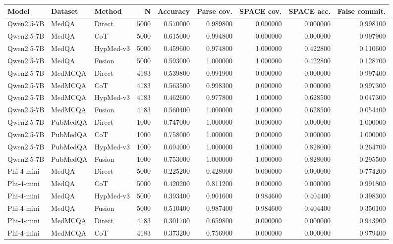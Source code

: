 \begin{tabular}{lllrrrrrr}
\toprule
Model & Dataset & Method & N & Accuracy & Parse cov. & SPACE cov. & SPACE acc. & False commit. \\
\midrule
Qwen2.5-7B & MedQA & Direct & 5000 & 0.570000 & 0.989800 & 0.000000 & 0.000000 & 0.998100 \\
Qwen2.5-7B & MedQA & CoT & 5000 & 0.615000 & 0.994800 & 0.000000 & 0.000000 & 0.997900 \\
Qwen2.5-7B & MedQA & HypMed-v3 & 5000 & 0.459600 & 0.974800 & 1.000000 & 0.422800 & 0.110600 \\
Qwen2.5-7B & MedQA & Fusion & 5000 & 0.593000 & 1.000000 & 1.000000 & 0.422800 & 0.128700 \\
Qwen2.5-7B & MedMCQA & Direct & 4183 & 0.539800 & 0.991900 & 0.000000 & 0.000000 & 0.997400 \\
Qwen2.5-7B & MedMCQA & CoT & 4183 & 0.563500 & 0.998300 & 0.000000 & 0.000000 & 0.997300 \\
Qwen2.5-7B & MedMCQA & HypMed-v3 & 4183 & 0.462600 & 0.977800 & 1.000000 & 0.628500 & 0.047300 \\
Qwen2.5-7B & MedMCQA & Fusion & 4183 & 0.560400 & 1.000000 & 1.000000 & 0.628500 & 0.054400 \\
Qwen2.5-7B & PubMedQA & Direct & 1000 & 0.747000 & 1.000000 & 0.000000 & 0.000000 & 1.000000 \\
Qwen2.5-7B & PubMedQA & CoT & 1000 & 0.758000 & 1.000000 & 0.000000 & 0.000000 & 1.000000 \\
Qwen2.5-7B & PubMedQA & HypMed-v3 & 1000 & 0.694000 & 1.000000 & 1.000000 & 0.828000 & 0.264700 \\
Qwen2.5-7B & PubMedQA & Fusion & 1000 & 0.753000 & 1.000000 & 1.000000 & 0.828000 & 0.295500 \\
Phi-4-mini & MedQA & Direct & 5000 & 0.225200 & 0.428000 & 0.000000 & 0.000000 & 0.774200 \\
Phi-4-mini & MedQA & CoT & 5000 & 0.420200 & 0.811200 & 0.000000 & 0.000000 & 0.991800 \\
Phi-4-mini & MedQA & HypMed-v3 & 5000 & 0.393400 & 0.901600 & 0.984600 & 0.404400 & 0.398300 \\
Phi-4-mini & MedQA & Fusion & 5000 & 0.510400 & 0.987400 & 0.984600 & 0.404400 & 0.350100 \\
Phi-4-mini & MedMCQA & Direct & 4183 & 0.301700 & 0.659800 & 0.000000 & 0.000000 & 0.943900 \\
Phi-4-mini & MedMCQA & CoT & 4183 & 0.373200 & 0.756900 & 0.000000 & 0.000000 & 0.979400 \\

\end{tabular}
